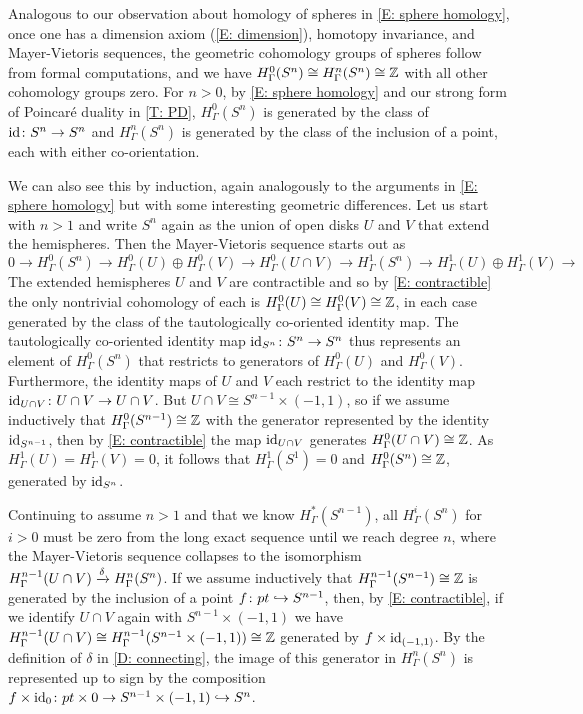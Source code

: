 \begin{example}\label{E: cohomology of spheres}
Analogous to our observation about homology of spheres in \cref{E: sphere homology}, once one has a dimension axiom (\cref{E: dimension}), homotopy invariance, and Mayer-Vietoris sequences, the geometric cohomology groups of spheres follow from formal computations, and we have $H^0_{\Gamma}(S^n)\cong H^n_\Gamma(S^n)\cong \mathbb{Z}$ with all other cohomology groups zero.
For $n>0$, by \cref{E: sphere homology} and our strong form of Poincar\'e duality in \cref{T: PD}, $H^0_{\Gamma}(S^n)$ is generated by the class of $\mathrm{id} \colon S^n \to S^n$ and $H^n_{\Gamma}(S^n)$ is generated by the class of the inclusion of a point, each with either co-orientation.

We can also see this by induction, again analogously to the arguments in \cref{E: sphere homology} but with some interesting geometric differences. Let us start with $n>1$ and write $S^n$ again as the union of open disks $U$ and $V$ that extend the hemispheres. Then the Mayer-Vietoris sequence starts out as
\begin{equation*}
0\to H^0_\Gamma(S^n) \to H^0_\Gamma(U) \oplus H^0_\Gamma(V) \to H^0_\Gamma(U\cap V) \to H^1_\Gamma(S^n) \to H^1_\Gamma(U) \oplus H^1_\Gamma(V) \to
\end{equation*}
The extended hemispheres $U$ and $V$ are contractible and so by \cref{E: contractible} the only nontrivial cohomology of each is $H^0_\Gamma(U) \cong H^0_\Gamma(V) \cong \mathbb{Z}$, in each case generated by the class of the tautologically co-oriented identity map.
The tautologically co-oriented identity map $\mathrm{id}_{S^n} \colon S^n \to S^n$ thus represents an element of $H^0_\Gamma(S^n)$ that restricts to generators of $H^0_\Gamma(U)$ and $H^0_\Gamma(V)$.
Furthermore, the identity maps of $U$ and $V$ each restrict to the identity map $\mathrm{id}_{U \cap V} \colon U \cap V \to U \cap V$.
But $U \cap V \cong S^{n-1} \times (-1,1)$, so if we assume inductively that $H^0_\Gamma(S^{n-1}) \cong \mathbb{Z}$ with the generator represented by the identity $\mathrm{id}_{S^{n-1}}$, then by \cref{E: contractible} the map $\mathrm{id}_{U \cap V}$ generates $H^0_\Gamma(U \cap V) \cong \mathbb{Z}$.
As $H^1_\Gamma(U) = H^1_\Gamma(V) = 0$, it follows that $H^1_\Gamma(S^1) = 0$ and $H^0_\Gamma(S^n) \cong \mathbb{Z}$, generated by $\mathrm{id}_{S^n}$.

Continuing to assume $n>1$ and that we know $H^*_\Gamma(S^{n-1})$, all $H^i_\Gamma(S^n)$ for $i>0$ must be zero from the long exact sequence until we reach degree $n$, where the Mayer-Vietoris sequence collapses to the isomorphism $H^{n-1}_\Gamma(U \cap V) \xrightarrow{\delta} H^n_\Gamma(S^n)$.
If we assume inductively that $H^{n-1}_\Gamma(S^{n-1}) \cong \mathbb{Z}$ is generated by the inclusion of a point $f \colon pt \hookrightarrow S^{n-1}$, then, by \cref{E: contractible}, if we identify $U \cap V$ again with $S^{n-1} \times (-1,1)$ we have $H^{n-1}_\Gamma(U \cap V) \cong H^{n-1}_\Gamma(S^{n-1} \times (-1,1))\cong \mathbb{Z}$ generated by $f \times \mathrm{id}_{(-1,1)}$.
By the definition of $\delta$ in \cref{D: connecting}, the image of this generator in $H^n_\Gamma(S^n)$ is represented up to sign by the composition $f \times \mathrm{id}_{0} \colon pt \times 0 \to S^{n-1} \times (-1,1) \hookrightarrow S^n$.


\end{example}

